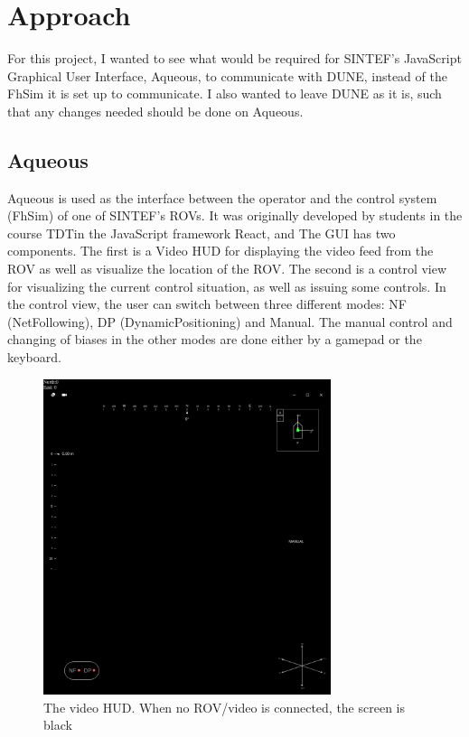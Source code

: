 \documentclass{article}
\begin{document}
%
%


%
%




\newpage
\section{Approach}
For this project, I wanted to see what would be required for SINTEF's JavaScript Graphical User Interface, Aqueous, to communicate with DUNE, instead of the FhSim it is set up to communicate.
I also wanted to leave DUNE as it is, such that any changes needed should be done on Aqueous.
\subsection{Aqueous}
Aqueous is used as the interface between the operator and the control system (FhSim) of one of SINTEF's ROVs.
It was originally developed by students in the course TDTin the JavaScript framework React, and 
The GUI has two components. The first is a Video HUD for displaying the video feed from the ROV as well as visualize the location of the ROV. 
The second is a control view for visualizing the current control situation, as well as issuing some controls. 
In the control view, the user can switch between three different modes: NF (NetFollowing), DP (DynamicPositioning) and Manual.
The manual control and changing of biases in the other modes are done either by a gamepad or the keyboard. 

\begin{figure}[H]
    \centering
    \includegraphics[width=0.75\textwidth]{AqHUD.png}
    \caption{The video HUD. When no ROV/video is connected, the screen is black}
    \label{fig:HUD}
\end{figure}
\end{document}
